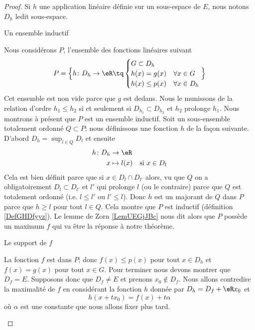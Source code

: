 \begin{proof}
    Si \( h\) une application linéaire définie sur un sous-espace de \( E\), nous notons \( D_h\) ledit sous-espace. 
    
    \begin{subproof}
    \item[Un ensemble inductif]

        Nous considérons \( P\), l'ensemble des fonctions linéaires suivant 
        \begin{equation}
            P=\Big\{  h\colon D_h\to \eR\tq
            \begin{cases}
                G\subset D_h\\
                h(x)=g(x)&\forall x\in G\\
                h(x)\leq p(x)&\forall x\in D_h
            \end{cases}
        \Big\}
        \end{equation}
        Cet ensemble est non vide parce que \( g\) est dedans. Nous le munissons de la relation d'ordre \( h_1\leq h_2\) si et seulement si \( D_{h_1}\subset D_{h_2}\) et \( h_2\) prolonge \( h_1\). Nous montrons à présent que \( P\) est un ensemble inductif. Soit un sous-ensemble totalement ordonné \( Q\subset P\); nous définissons une fonction \( h\) de la façon suivante. D'abord \( D_h=\sup_{l\in Q}D_l\) et ensuite
        \begin{equation}
            \begin{aligned}
                h\colon D_h&\to \eR \\
                x&\mapsto l(x)&\text{si \( x\in D_l\)}
            \end{aligned}
        \end{equation}
        Cela est bien définit parce que si \( x\in D_l\cap D_{l'}\) alors, vu que \( Q\) on a obligatoirement \( D_l\subset D_{l'}\) et \( l'\) qui prolonge \( l\) (ou le contraire) parce que \( Q\) est totalement ordonné (i.e. \( l\leq l'\) ou \( l'\leq l\)). Donc \( h\) est un majorant de \( Q\) dans \( P\) parce que \( h\geq l\) pour tout \( l\in Q\). Cela montre que \( P\) est inductif (définition \ref{DefGHDfyyz}). Le lemme de Zorn \ref{LemUEGjJBc} nous dit alors que \( P\) possède un maximum \( f\) qui va être la réponse à notre théorème.

    \item[Le support de \( f\)]

        La fonction \( f\) est dans \( P\); donc \( f(x)\leq p(x)\) pour tout \( x\in D_h\) et \( f(x)=g(x)\) pour tout \( x\in G\). Pour terminer nous devons montrer que \( D_f=E\). Supposons donc que \( D_f\neq E\) et prenons \( x_0\notin D_f\). Nous allons contredire la maximalité de \( f\) en considérant la fonction \( h\) donnée par \( D_h=D_f+\eR x_0 \) et
        \begin{equation}
            h(x+tx_0)=f(x)+t\alpha
        \end{equation}
        où \( \alpha\) est une constante que nous allons fixer plus tard.


\end{subproof}
\end{proof}
